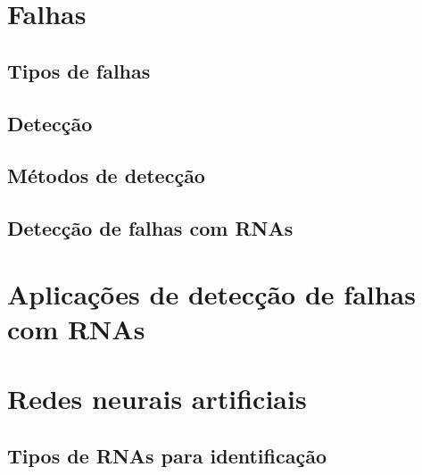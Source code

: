 \label{cap:aspectos}

\section{Falhas}

\subsection{Tipos de falhas}

\subsection{Detecção}

\subsection{Métodos de detecção}

\subsection{Detecção de falhas com RNAs}

\section{Aplicações de detecção de falhas com RNAs}

\section{Redes neurais artificiais}

\subsection{Tipos de RNAs para identificação}

